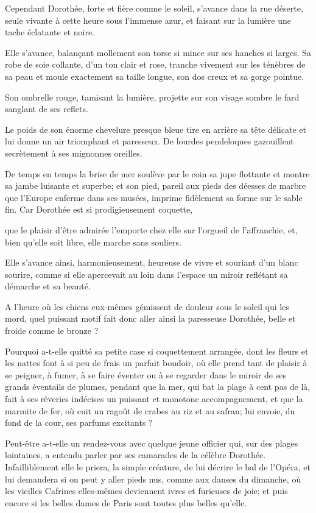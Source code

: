 Cependant Dorothée, forte et fière comme le soleil,
s’avance dans la rue déserte, seule vivante à cette
heure sous l’immense azur, et faisant sur la lumière
une tache éclatante et noire.

Elle s’avance, balançant mollement son torse si mince
sur ses hanches si larges. Sa robe de soie collante,
d’un ton clair et rose, tranche vivement sur les
ténèbres de sa peau et moule exactement sa taille longue, son dos creux
et sa gorge pointue.

Son ombrelle rouge, tamisant la lumière, projette sur son visage sombre
le fard sanglant de ses reflets.

Le poids de son énorme chevelure presque bleue tire en arrière sa tête
délicate et lui donne un air triomphant et paresseux. De lourdes
pendeloques gazouillent secrètement à ses mignonnes oreilles.

De temps en temps la brise de mer soulève par le coin sa jupe flottante
et montre sa jambe luisante et superbe; et son pied, pareil aux pieds
des déesses de marbre que l’Europe enferme dans ses
musées, imprime fidèlement sa forme sur le sable fin. Car Dorothée est
si prodigieusement coquette,

\quebra

\noindent{}que le plaisir d’être
admirée l’emporte chez elle sur
l’orgueil de l’affranchie, et, bien
qu’elle soit libre, elle marche sans souliers.

Elle s’avance ainsi, harmonieusement, heureuse de vivre
et souriant d’un blanc sourire, comme si elle
apercevait au loin dans l’espace un miroir reflétant
sa démarche et sa beauté.

A l’heure où les chiens eux{}-mêmes gémissent de
douleur sous le soleil qui les mord, quel puissant motif fait donc
aller ainsi la paresseuse Dorothée, belle et froide comme le bronze ?

Pourquoi a{}-t{}-elle quitté sa petite case si coquettement arrangée,
dont les fleurs et les nattes font à si peu de frais un parfait
boudoir, où elle prend tant de plaisir à se peigner, à fumer, à se
faire éventer ou à se regarder dans le miroir de ses grands éventails
de plumes, pendant que la mer, qui bat la plage à cent pas de là, fait
à ses rêveries indécises un puissant et monotone accompagnement, et que
la marmite de fer, où cuit un ragoût de crabes au riz et au safran; lui
envoie, du fond de la cour, ses parfums excitants ?

Peut{}-être a{}-t{}-elle un rendez{}-vous avec quelque jeune officier
qui, sur des plages lointaines, a entendu parler par ses camarades de
la célèbre Dorothée. Infailliblement elle le priera, la simple
créature, de lui décrire le bal de l’Opéra, et lui
demandera si on peut y aller pieds nus, comme aux danses du dimanche,
où les vieilles Cafrines elles{}-mêmes deviennent ivres et furieuses de
joie; et puis encore si les belles dames de Paris sont toutes plus
belles qu’elle.

